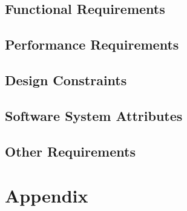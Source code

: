 \documentclass[a4paper,12pt]{article}
\begin{document}
\subsection{Functional Requirements}
\subsection{Performance Requirements}
\subsection{Design Constraints}
\subsection{Software System Attributes}
\subsection{Other Requirements}
\section{Appendix}
\newpage
\end{document}
